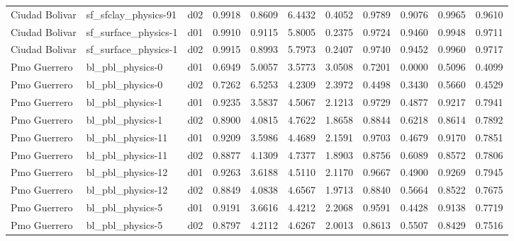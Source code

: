 \begin{longtable}{lllrrrrrrrr}
       Ciudad Bolivar  &  sf\_sfclay\_physics-91 &     d02 &   0.9918 &   0.8609 &   6.4432 &       0.4052 &        0.9789 &       0.9076 &           0.9965 &  0.9610 \\
       Ciudad Bolivar  &  sf\_surface\_physics-1 &     d01 &   0.9910 &   0.9115 &   5.8005 &       0.2375 &        0.9724 &       0.9460 &           0.9948 &  0.9711 \\
       Ciudad Bolivar  &  sf\_surface\_physics-1 &     d02 &   0.9915 &   0.8993 &   5.7973 &       0.2407 &        0.9740 &       0.9452 &           0.9960 &  0.9717 \\
         Pmo Guerrero  &      bl\_pbl\_physics-0 &     d01 &   0.6949 &   5.0057 &   3.5773 &       3.0508 &        0.7201 &       0.0000 &           0.5096 &  0.4099 \\
         Pmo Guerrero  &      bl\_pbl\_physics-0 &     d02 &   0.7262 &   6.5253 &   4.2309 &       2.3972 &        0.4498 &       0.3430 &           0.5660 &  0.4529 \\
         Pmo Guerrero  &      bl\_pbl\_physics-1 &     d01 &   0.9235 &   3.5837 &   4.5067 &       2.1213 &        0.9729 &       0.4877 &           0.9217 &  0.7941 \\
         Pmo Guerrero  &      bl\_pbl\_physics-1 &     d02 &   0.8900 &   4.0815 &   4.7622 &       1.8658 &        0.8844 &       0.6218 &           0.8614 &  0.7892 \\
         Pmo Guerrero  &     bl\_pbl\_physics-11 &     d01 &   0.9209 &   3.5986 &   4.4689 &       2.1591 &        0.9703 &       0.4679 &           0.9170 &  0.7851 \\
         Pmo Guerrero  &     bl\_pbl\_physics-11 &     d02 &   0.8877 &   4.1309 &   4.7377 &       1.8903 &        0.8756 &       0.6089 &           0.8572 &  0.7806 \\
         Pmo Guerrero  &     bl\_pbl\_physics-12 &     d01 &   0.9263 &   3.6188 &   4.5110 &       2.1170 &        0.9667 &       0.4900 &           0.9269 &  0.7945 \\
         Pmo Guerrero  &     bl\_pbl\_physics-12 &     d02 &   0.8849 &   4.0838 &   4.6567 &       1.9713 &        0.8840 &       0.5664 &           0.8522 &  0.7675 \\
         Pmo Guerrero  &      bl\_pbl\_physics-5 &     d01 &   0.9191 &   3.6616 &   4.4212 &       2.2068 &        0.9591 &       0.4428 &           0.9138 &  0.7719 \\
         Pmo Guerrero  &      bl\_pbl\_physics-5 &     d02 &   0.8797 &   4.2112 &   4.6267 &       2.0013 &        0.8613 &       0.5507 &           0.8429 &  0.7516 \\

\end{longtable}
